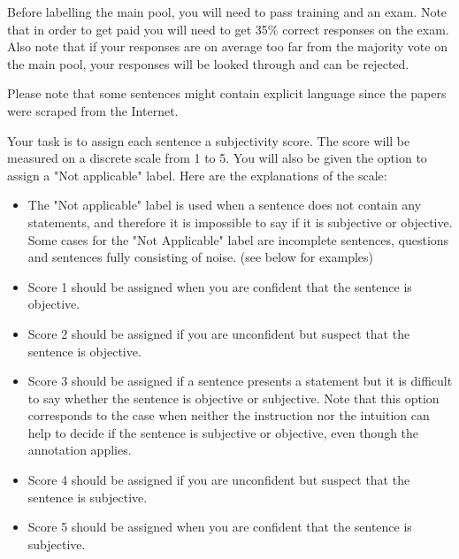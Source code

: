 \documentclass[a4paper,14pt]{extarticle}
\begin{document}
Before labelling the main pool, you will need to pass training and an exam. Note that in order to get paid you will need to get 35\% correct responses on the exam. Also note that if your responses are on average too far from the majority vote on the main pool, your responses will be looked through and can be rejected.

Please note that some sentences might contain explicit language since the papers were scraped from the Internet.

Your task is to assign each sentence a subjectivity score. The score will be measured on a discrete scale from 1 to 5. You will also be given the option to assign a "Not applicable" label. Here are the explanations of the scale:

\begin{itemize}
    \item The "Not applicable" label is used when a sentence does not contain any statements, and therefore it is impossible to say if it is subjective or objective. Some cases for the "Not Applicable" label are incomplete sentences, questions and sentences fully consisting of noise. (see below for examples)
    \item Score 1 should be assigned when you are confident that the sentence is objective.
    \item Score 2 should be assigned if you are unconfident but suspect that the sentence is objective.
    \item Score 3 should be assigned if a sentence presents a statement but it is difficult to say whether the sentence is objective or subjective. Note that this option corresponds to the case when neither the instruction nor the intuition can help to decide if the sentence is subjective or objective, even though the annotation applies.
    \item Score 4 should be assigned if you are unconfident but suspect that the sentence is subjective.
    \item Score 5 should be assigned when you are confident that the sentence is subjective.
\end{itemize}
\end{document}
